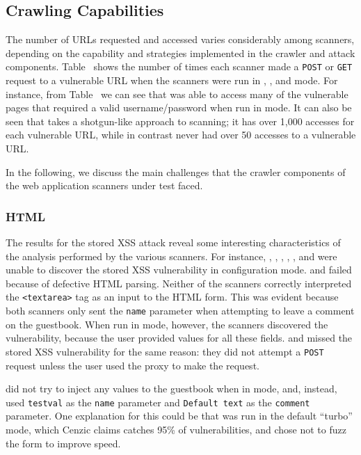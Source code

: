 

\subsection{Crawling Capabilities}

The number of URLs requested and accessed varies considerably among scanners,
depending on the capability and strategies implemented in the crawler and
attack components. Table~ shows the number of times each scanner
made a {\tt POST} or {\tt GET} request to a vulnerable URL when the scanners
were run in \initial{}, \config{}, and \manual{} mode.
For instance, from
Table~ we can see that \hailstorm{} was able to access many of the
vulnerable pages that required a valid username/password when run in \initial{} mode. It
can also be seen that \nstalker{} takes a shotgun-like approach to scanning;
it has over 1,000 accesses for each vulnerable URL, while in contrast
\grendelscan{} never had over 50 accesses to a vulnerable URL.  

In the following, we discuss the main challenges that the crawler components of the
web application scanners under test faced.


\subsubsection{HTML}
The results for the stored XSS attack reveal some interesting characteristics of
the analysis performed by the various scanners. For instance, \burp{}, \grendelscan{}, \hailstorm{},
\milescan{}, \nstalker{}, and \waf{} were unable to discover the stored XSS
vulnerability in \initial{} configuration mode. \burp{} and \nstalker{} failed
because of defective HTML parsing. Neither of the scanners correctly
interpreted the {\tt <textarea>} tag as an input to the HTML form. This
was evident because both scanners only sent the {\tt name} parameter when
attempting to leave a comment on the guestbook. When run in \manual{} mode,
however, the scanners discovered the
vulnerability, because the user provided values for all these fields. 
\grendelscan{} and \milescan{} missed the stored XSS vulnerability for
the same reason: they did not attempt a {\tt POST}
request unless the user used the proxy to make the request. 

\hailstorm{} did not try to inject any values to the guestbook when in
\initial{} mode, and, instead, used {\tt testval} as the {\tt name} parameter
and {\tt Default text} as the {\tt comment} parameter. One explanation for
this could be that \hailstorm{} was run in the default ``turbo'' mode, which
Cenzic claims catches 95\% of vulnerabilities, and chose not to fuzz
the form to improve speed.

